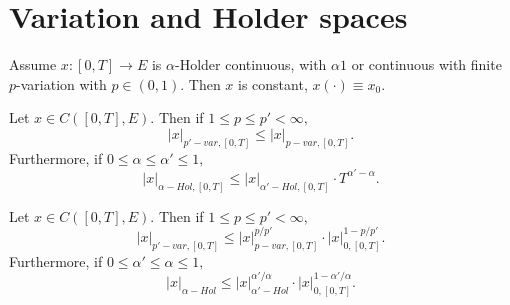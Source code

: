 \section{Variation and Holder spaces}

\begin{proposition}
    Assume $x: [0,T] \rightarrow E$ is $\alpha$-Holder continuous, with $\alpha 1$ or continuous with finite $p$-variation with $p \in (0, 1).$
    Then $x$ is constant, $x(\cdot) \equiv x_0.$
\end{proposition}

\begin{proposition}
    Let $x \in C([0,T], E)$. Then if $1 \leq p \leq p' < \infty,$
    \begin{equation}
        |x|_{p'-var, [0,T]} \leq |x|_{p-var, [0,T]}. 
    \end{equation} 
    Furthermore, if $0 \leq \alpha \leq \alpha' \leq 1,$
    \begin{equation}
        |x|_{\alpha-Hol,[0,T]} \leq |x|_{\alpha'-Hol,[0,T]} \cdot T^{\alpha' - \alpha}.
    \end{equation}
\end{proposition}

\begin{proposition}[Interpolation]
        Let $x \in C([0,T], E)$. Then if $1 \leq p \leq p' < \infty,$
    \begin{equation}
        |x|_{p'-var, [0,T]} \leq |x|_{p-var, [0,T]}^{p/p'} \cdot |x|_{0,[0,T]}^{1 - p/p'}. 
    \end{equation} 
    Furthermore, if $0 \leq \alpha' \leq \alpha \leq 1,$
    \begin{equation}
        |x|_{\alpha-Hol} \leq |x|_{\alpha'-Hol}^{\alpha' / \alpha} \cdot |x|_{0,[0,T]}^{1 - \alpha' / \alpha}.
    \end{equation}
\end{proposition}

